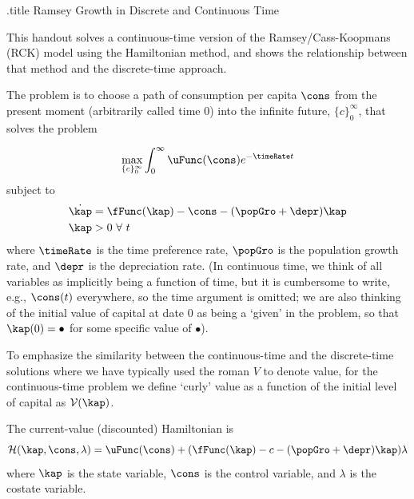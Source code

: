 \documentclass{handout}
\begin{document}
\handoutHeader

\begin{verbatimwrite}{\jobname.title}
Ramsey Growth in Discrete and Continuous Time
\end{verbatimwrite}

\handoutNameMake 

This handout solves a continuous-time version of the Ramsey/Cass-Koopmans (RCK) model using the Hamiltonian method, and shows the relationship between that method and the discrete-time approach.

The problem is to choose a path of consumption per capita $\cons$ from the present moment (arbitrarily called time 0) into the infinite future, $\{c\}_{0}^{\infty}$, that solves the problem

\begin{equation}
    \max_{\{c\}_{0}^{\infty}} \int_{0}^{\infty} \uFunc(\cons) e^{-\timeRate t} \label{eq:maxprob}
\end{equation}
subject to
\begin{equation}\begin{gathered}\begin{aligned}
        \dot{\kap} & =  \fFunc(\kap) - \cons - (\popGro+\depr)\kap 
\\      \kap & >  0 ~\forall~t
\end{aligned}\end{gathered}\end{equation}
where $\timeRate$ is the time preference rate, $\popGro$ is the population growth rate, and $\depr$ is the depreciation rate.  (In continuous time, we think of all variables as implicitly being a function of time, but it is cumbersome to write, e.g., $\cons(t)$ everywhere, so the time argument is omitted; we are also thinking of the initial value of capital at date 0 as being a `given' in the problem, so that $\kap(0)=\bullet$ for some specific 
value of $\bullet$).

To emphasize the similarity between the continuous-time and the discrete-time solutions where we have typically
used the roman $V$ to denote value, for the continuous-time problem we define `curly' value as a function of the initial level of capital as $\mathcal{V}(\kap)$.

The current-value (discounted) Hamiltonian is
\begin{equation}
        \mathcal{H}(\kap,\cons,\lambda) = \uFunc(\cons) + (\fFunc(\kap)-c-(\popGro+\depr)\kap)\lambda 
        \label{eq:hamilt}
\end{equation}
where $\kap$ is the state variable, $\cons$ is the control variable, and 
$\lambda$ is the costate variable.
\end{document}
